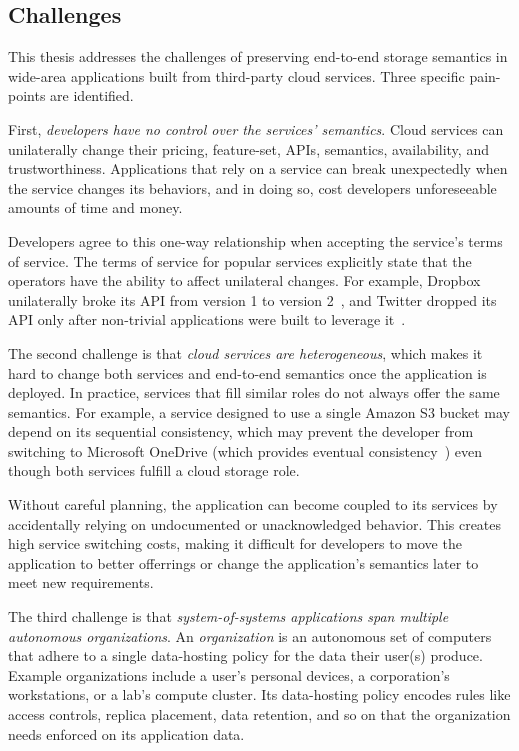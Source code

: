 \subsection{Challenges}

This thesis addresses the challenges of preserving end-to-end storage semantics
in wide-area applications built from third-party cloud services.  Three specific
pain-points are identified.

First, \emph{developers have no control over the services' semantics}.
Cloud services can unilaterally
change their pricing, feature-set, APIs, semantics, availability, and
trustworthiness.  Applications that rely on a service can break unexpectedly
when the service changes its behaviors, and in doing so,
cost developers unforeseeable amounts of time and money.

Developers agree to this one-way relationship when accepting the service's terms of service.  The terms of
service for popular services explicitly state that the operators have the ability to affect unilateral
changes.  For example, Dropbox unilaterally broke its API from version 1 to version
2~\cite{dropbox-v2-api-psa}, and Twitter dropped its API only after non-trivial
applications were built to leverage it~\cite{twitter-api-deprecation-psa}.

The second challenge is that \emph{cloud services are heterogeneous}, which
makes it hard to change both services and end-to-end semantics once the application is deployed.
In practice, services that fill similar roles do not always offer the same semantics.
For example, a service designed to use a single Amazon S3 bucket may 
depend on its sequential consistency, which may prevent the developer from
switching to Microsoft OneDrive (which provides eventual
consistency~\cite{consistency-comparison-cloud-storage}) even though both
services fulfill a cloud storage role.   %

Without careful planning, the application can become coupled
to its services by accidentally relying on undocumented or unacknowledged
behavior.  This creates high service switching costs, making it
difficult for developers to move the application to better
offerrings or change the application's semantics later to meet new requirements.

The third challenge is that \emph{system-of-systems applications
span multiple autonomous organizations}.  An \emph{organization} is an autonomous set of computers that
adhere to a single data-hosting policy for the data their user(s) produce.
Example organizations include a user's personal devices,
a corporation's workstations, or a lab's compute cluster.  Its data-hosting policy
encodes rules like access controls, replica placement, data retention,
and so on that the organization needs enforced on its application data.

